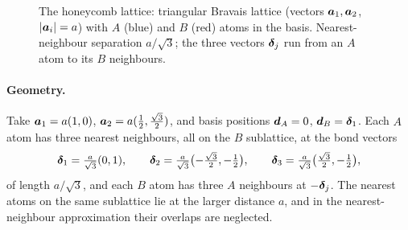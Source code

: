\begin{figure}[ht]
\centering
{}
\caption{The honeycomb lattice: triangular Bravais lattice (vectors $\bm{a}_1,\bm{a}_2$, $|\bm{a}_i|=a$) with $A$ (blue) and $B$ (red) atoms in the basis. Nearest-neighbour separation $a/\sqrt3$; the three vectors $\bm{\delta}_j$ run from an $A$ atom to its $B$ neighbours.}
\label{fig:graphene-lattice}
\end{figure}

\paragraph{Geometry.} Take $\bm{a}_1 = a(1,0)$, $\bm{a}_2 = a(\tfrac12,\tfrac{\sqrt3}{2})$, and basis positions $\bm{d}_A=0$, $\bm{d}_B=\bm{\delta}_1$. Each $A$ atom has three nearest neighbours, all on the $B$ sublattice, at the bond vectors
\begin{equation}
    \bm{\delta}_1 = \tfrac{a}{\sqrt3}(0,1), \qquad
    \bm{\delta}_2 = \tfrac{a}{\sqrt3}\bigl(-\tfrac{\sqrt3}{2},-\tfrac12\bigr), \qquad
    \bm{\delta}_3 = \tfrac{a}{\sqrt3}\bigl(\tfrac{\sqrt3}{2},-\tfrac12\bigr),
\end{equation}
of length $a/\sqrt3$, and each $B$ atom has three $A$ neighbours at $-\bm{\delta}_j$. The nearest atoms on the same sublattice lie at the larger distance $a$, and in the nearest-neighbour approximation their overlaps are neglected.

